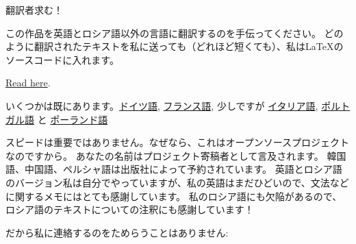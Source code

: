 \vspace*{\fill}

\Huge 翻訳者求む！

\normalsize

\bigskip
\bigskip
\bigskip

この作品を英語とロシア語以外の言語に翻訳するのを手伝ってください。
どのように翻訳されたテキストを私に送っても（どれほど短くても）、私はLaTeXのソースコードに入れます。

\href{https://github.com/dennis714/RE-for-beginners/blob/master/Translation.md}{Read here}.

いくつかは既にあります。\href{https://beginners.re/RE4B-DE.pdf}{ドイツ語},
\href{https://beginners.re/RE4B-FR.pdf}{フランス語}, 少しですが
\href{https://yurichev.com/tmp/RE4B-IT-partial.pdf}{イタリア語},
\href{https://yurichev.com/tmp/RE4B-PTBR-lite2.pdf}{ポルトガル語} と
\href{https://yurichev.com/tmp/RE4B-PL.pdf}{ポーランド語}

スピードは重要ではありません。なぜなら、これはオープンソースプロジェクトなのですから。
あなたの名前はプロジェクト寄稿者として言及されます。
韓国語、中国語、ペルシャ語は出版社によって予約されています。
英語とロシア語のバージョン私は自分でやっていますが、私の英語はまだひどいので、文法などに関するメモにはとても感謝しています。
私のロシア語にも欠陥があるので、ロシア語のテキストについての注釈にも感謝しています！

だから私に連絡するのをためらうことはありません: \GTT{\EMAIL}

\vspace*{\fill}
\vfill
